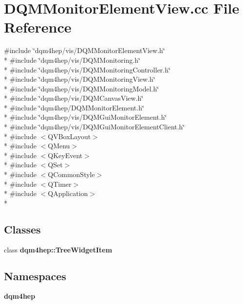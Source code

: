 \section{D\+Q\+M\+Monitor\+Element\+View.\+cc File Reference}
\label{DQMMonitorElementView_8cc}
{\ttfamily \#include \char`\"{}dqm4hep/vis/\+D\+Q\+M\+Monitor\+Element\+View.\+h\char`\"{}}\\*
{\ttfamily \#include \char`\"{}dqm4hep/vis/\+D\+Q\+M\+Monitoring.\+h\char`\"{}}\\*
{\ttfamily \#include \char`\"{}dqm4hep/vis/\+D\+Q\+M\+Monitoring\+Controller.\+h\char`\"{}}\\*
{\ttfamily \#include \char`\"{}dqm4hep/vis/\+D\+Q\+M\+Monitoring\+View.\+h\char`\"{}}\\*
{\ttfamily \#include \char`\"{}dqm4hep/vis/\+D\+Q\+M\+Monitoring\+Model.\+h\char`\"{}}\\*
{\ttfamily \#include \char`\"{}dqm4hep/vis/\+D\+Q\+M\+Canvas\+View.\+h\char`\"{}}\\*
{\ttfamily \#include \char`\"{}dqm4hep/\+D\+Q\+M\+Monitor\+Element.\+h\char`\"{}}\\*
{\ttfamily \#include \char`\"{}dqm4hep/vis/\+D\+Q\+M\+Gui\+Monitor\+Element.\+h\char`\"{}}\\*
{\ttfamily \#include \char`\"{}dqm4hep/vis/\+D\+Q\+M\+Gui\+Monitor\+Element\+Client.\+h\char`\"{}}\\*
{\ttfamily \#include $<$Q\+V\+Box\+Layout$>$}\\*
{\ttfamily \#include $<$Q\+Menu$>$}\\*
{\ttfamily \#include $<$Q\+Key\+Event$>$}\\*
{\ttfamily \#include $<$Q\+Set$>$}\\*
{\ttfamily \#include $<$Q\+Common\+Style$>$}\\*
{\ttfamily \#include $<$Q\+Timer$>$}\\*
{\ttfamily \#include $<$Q\+Application$>$}\\*
\subsection*{Classes}
\begin{DoxyCompactItemize}
\item 
class {\bf dqm4hep\+::\+Tree\+Widget\+Item}
\end{DoxyCompactItemize}
\subsection*{Namespaces}
\begin{DoxyCompactItemize}
\item 
 {\bf dqm4hep}
\end{DoxyCompactItemize}
